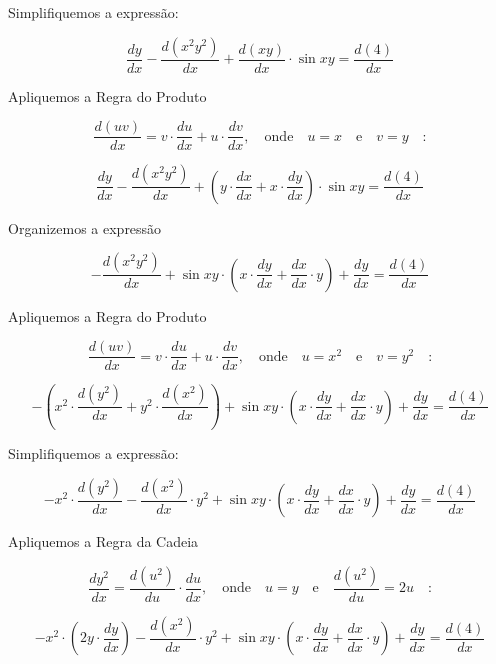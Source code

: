 \documentclass{article}
\begin{document}
Simplifiquemos a expressão:

\[
    \frac{dy}{dx} - \frac{d(x^2y^2)}{dx} + \frac{d(xy)}{dx} \cdot  \sin xy   = \frac{d(4)}{dx}
\]

Apliquemos a Regra do Produto

\[
    \frac{d(uv)}{dx}
    =
    v \cdot \frac{du}{dx}
    +
    u \cdot \frac{dv}{dx},
    \quad
    \text{onde}
    \quad
    u = x
    \quad
    \text{e}
    \quad
    v = y
    \quad
    \text{:}
\]

\[
    \frac{dy}{dx}
    -
    \frac{d(x^2y^2)}{dx}
    +
    \left(
    y
    \cdot
    \frac{dx}{dx}
    +
    x
    \cdot
    \frac{dy}{dx}
    \right)
    \cdot
    \sin xy
    =
    \frac{d(4)}{dx}
\]

Organizemos a expressão

\[
    -
    \frac{d(x^2y^2)}{dx}
    +
    \sin xy
    \cdot
    \left(
    x
    \cdot
    \frac{dy}{dx}
    +
    \frac{dx}{dx}
    \cdot
    y
    \right)
    +
    \frac{dy}{dx}
    =
    \frac{d(4)}{dx}
\]

Apliquemos a Regra do Produto

\[
    \frac{d(uv)}{dx}
    =
    v
    \cdot
    \frac{du}{dx}
    +
    u
    \cdot
    \frac{dv}{dx}
    ,
    \quad
    \text{onde}
    \quad
    u = x^2
    \quad
    \text{e}
    \quad
    v = y^2
    \quad
    \text{:}
\]

\[
    -
    \left(
    x^2
    \cdot
    \frac{d(y^2)}{dx}
    +
    y^2
    \cdot
    \frac{d(x^2)}{dx}
    \right)
    +
    \sin xy
    \cdot
    \left(
    x
    \cdot
    \frac{dy}{dx}
    +
    \frac{dx}{dx}
    \cdot
    y
    \right)
    +
    \frac{dy}{dx}
    =
    \frac{d(4)}{dx}
\]

Simplifiquemos a expressão:

\[
    -
    x^2
    \cdot
    \frac{d(y^2)}{dx}
    -
    \frac{d(x^2)}{dx}
    \cdot
    y^2
    +
    \sin xy
    \cdot
    \left(
    x
    \cdot
    \frac{dy}{dx}
    +
    \frac{dx}{dx}
    \cdot
    y
    \right)
    +
    \frac{dy}{dx}
    =
    \frac{d(4)}{dx}
\]

Apliquemos a Regra da Cadeia

\[
    \frac{d y^2}{dx}
    =
    \frac{d(u^2)}{du}
    \cdot
    \frac{du}{dx}
    ,
    \quad
    \text{onde}
    \quad
    u = y
    \quad
    \text{e}
    \quad
    \frac{d(u^2)}{du}
    =
    2u
    \quad
    \text{:}
\]

\[
    -
    x^2
    \cdot
    \left(
    2y
    \cdot
    \frac{dy}{dx}
    \right)
    -
    \frac{d(x^2)}{dx}
    \cdot
    y^2
    +
    \sin xy
    \cdot
    \left(
    x
    \cdot
    \frac{dy}{dx}
    +
    \frac{dx}{dx}
    \cdot
    y
    \right)
    +
    \frac{dy}{dx}
    =
    \frac{d(4)}{dx}
\]
\end{document}

